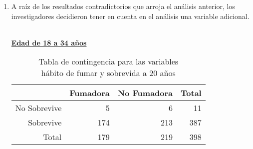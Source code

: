 \documentclass[12pt,letterpaper,fleqn]{article}
\begin{document}
\begin{enumerate}[label=\textbf{\arabic*.}]
\begin{enumerate}[label=\textbf{\alph*.}]
                \item  %
                A raíz de los resultados contradictorios que arroja el análisis anterior, los investigadores decidieron tener en cuenta en el análisis una variable adicional.
                \begin{table}[ht]
                    \centering
                    \caption{Estudio con variable Edad de las personas}
                    \begin{threeparttable}
                    \end{threeparttable}
                \end{table}
                \\
                \underline{\textbf{Edad de 18 a 34 años}}
                \begin{table}[ht]
                    \centering
                    \caption{Tabla de contingencia para las variables \\ hábito de fumar y sobrevida a 20 años}
                    \begin{tabular}{rrrr}
                      \hline
                     & Fumadora & No Fumadora \vline & Total \\
                      \hline
                    No Sobrevive & 5 & 6 \vline & 11 \\
                      Sobrevive & 174 & 213 \vline & 387 \\
                      \hline
                      Total & 179 & 219 \vline  & 398 \\
                       \hline
                    \end{tabular}
                \end{table}


\end{enumerate}
\end{enumerate}
\end{document}
